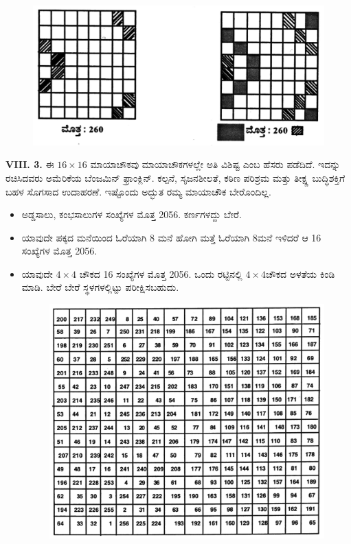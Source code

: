 \begin{figure}[H]
\includegraphics{src/figures/chap7/fig7-6.jpg}
\end{figure}

\textbf{VIII. 3.} ಈ $16 \times 16$ ಮಾಯಾಚೌಕವು ಮಾಯಾಚೌಕಗಳಲ್ಲೇ ಅತಿ ವಿಶಿಷ್ಟ ಎಂಬ ಹೆಸರು ಪಡೆದಿದೆ. ಇದನ್ನು ರಚಿಸಿದವರು ಅಮೆರಿಕೆಯ ಬೆಂಜಮಿನ್ ಫ್ರಾಂಕ್ಲಿನ್. ಕಲ್ಪನೆ, ಸೃಜನಶೀಲತೆ, ಕಠಿಣ ಪರಿಶ್ರಮ ಮತ್ತು ತೀಕ್ಷ್ಣ ಬುದ್ಧಿಶಕ್ತಿಗೆ ಬಹಳ ಸೊಗಸಾದ ಉದಾಹರಣೆ. ಇಷ್ಟೊಂದು ಅದ್ಭುತ ರಮ್ಯ ಮಾಯಾಚೌಕ ಬೇರೊಂದಿಲ್ಲ.

\begin{itemize}
	\item ಅಡ್ಡಸಾಲು, ಕಂಭಸಾಲುಗಳ ಸಂಖ್ಯೆಗಳ ಮೊತ್ತ 2056. ಕರ್ಣಗಳದ್ದು ಬೇರೆ.
	\item ಯಾವುದೇ ಪಕ್ಕದ ಮನೆಯಿಂದ ಓರೆಯಾಗಿ 8 ಮನೆ ಹೋಗಿ ಮತ್ತೆ ಓರೆಯಾಗಿ 8ಮನೆ ಇಳಿದರೆ ಆ 16 ಸಂಖ್ಯೆಗಳ ಮೊತ್ತ 2056.
	\item ಯಾವುದೇ $4 \times 4$ ಚೌಕದ 16 ಸಂಖ್ಯೆಗಳ ಮೊತ್ತ 2056. ಒಂದು ರಟ್ಟಿನಲ್ಲಿ $4 \times 4$ಚೌಕದ ಅಳತೆಯ ಕಿಂಡಿ ಮಾಡಿ. ಬೇರೆ ಬೇರೆ ಸ್ಥಳಗಳಲ್ಲಿಟ್ಟು ಪರೀಕ್ಷಿಸಬಹುದು.
	\begin{figure}[H]
	\includegraphics[scale=.9]{src/figures/chap7/fig7-7.jpg}
	\end{figure}
\end{itemize}

